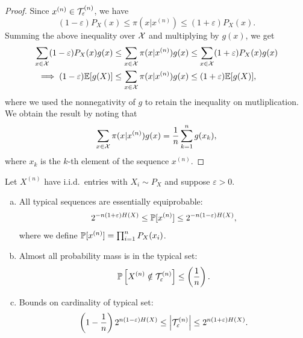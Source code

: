 \documentclass[11pt,a4paper]{article}
\begin{document}
\begin{proof}
    Since $x^{(n)}\in\mathcal{T}^{(n)}_\varepsilon$, we have
    \begin{equation*}
        (1-\varepsilon) P_X(x) \le \pi(x|x^{(n)}) \le (1+\varepsilon) P_X(x).
    \end{equation*}
    Summing the above inequality over $\mathcal{X}$ and multiplying by $g(x)$, we get 
    \begin{align*}
        \sum_{x\in\mathcal{X}} (1-\varepsilon) P_X(x) g(x) &\le \sum_{x\in\mathcal{X}} \pi(x|x^{(n)}) g(x) \le \sum_{x\in\mathcal{X}} (1+\varepsilon) P_X(x) g(x) \\
        \implies (1-\varepsilon) \mathbb{E}[g(X)] &\le \sum_{x\in\mathcal{X}} \pi(x|x^{(n)}) g(x) \le (1+\varepsilon) \mathbb{E}[g(X)],
    \end{align*} 
    where we used the nonnegativity of $g$ to retain the inequality on mutliplication. We obtain the result by noting that
    \begin{equation*}
        \sum_{x\in\mathcal{X}} \pi(x|x^{(n)}) g(x) = \dfrac{1}{n} \sum_{k=1}^n g(x_k),
    \end{equation*}
    where $x_k$ is the $k$-th element of the sequence $x^{(n)}$.
\end{proof}

\begin{theorem}
    Let $X^{(n)}$ have i.i.d.~entries with $X_i\sim P_X$ and suppose $\varepsilon>0$.
    \begin{enumerate}[(a)]
        \item All typical sequences are essentially equiprobable:
        \begin{equation*}
            2^{-n(1+\varepsilon)H(X)} \le \mathbb{P}[x^{(n)}] \le 2^{-n(1-\varepsilon)H(X)},
        \end{equation*}
        where we define $\mathbb{P}[x^{(n)}] = \prod_{i=1}^{n} P_X(x_i)$.
        \item Almost all probability mass is in the typical set: 
        \begin{equation*}
            \mathbb{P}\left[ X^{(n)} \notin \mathcal{T}^{(n)}_\varepsilon \right] \le \left(\dfrac{1}{n}\right).
        \end{equation*}
        \item Bounds on cardinality of typical set:
        \begin{equation*}
            \left(1-\dfrac{1}{n}\right) 2^{n(1-\varepsilon)H(X)} \le \left| \mathcal{T}^{(n)}_\varepsilon \right| \le 2^{n(1+\varepsilon)H(X)}.
        \end{equation*}
    \end{enumerate}
\end{theorem}
\end{document}
